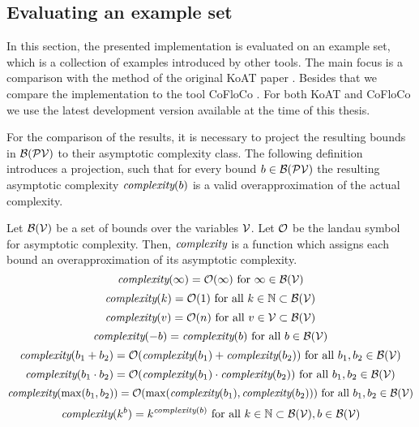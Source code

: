 \iffalse

\fi

\subsection{Evaluating an example set}

In this section, the presented implementation is evaluated on an example set, which is a collection of examples introduced by other tools.
The main focus is a comparison with the method of the original KoAT paper \cite{koat}.
Besides that we compare the implementation to the tool CoFloCo \cite{cofloco3}.
For both KoAT and CoFloCo we use the latest development version available at the time of this thesis.

For the comparison of the results, it is necessary to project the resulting bounds in $\mathcal{B}(\mathcal{PV})$ to their asymptotic complexity class.
The following definition introduces a projection, such that for every bound $b \in \mathcal{B}(\mathcal{PV})$ the resulting asymptotic complexity $\emph{complexity}(b)$ is a valid overapproximation of the actual complexity.

\begin{definition}
  Let $\mathcal{B}(\mathcal{V})$ be a set of bounds over the variables $\mathcal{V}$.
  Let $\mathcal{O}$ be the landau symbol for asymptotic complexity.
  Then, $\emph{complexity}$ is a function which assigns each bound an overapproximation of its asymptotic complexity.
  \[ \emph{complexity}(\infty) = \mathcal{O}(\infty) \text{ for } \infty \in \mathcal{B}(\mathcal{V}) \]
  \[ \emph{complexity}(k) = \mathcal{O}(1) \text{ for all } k \in \mathbb{N} \subset \mathcal{B}(\mathcal{V}) \] 
  \[ \emph{complexity}(v) = \mathcal{O}(n) \text{ for all } v \in \mathcal{V} \subset \mathcal{B}(\mathcal{V}) \] 
  \[ \emph{complexity}(-b) = \emph{complexity}(b) \text{ for all } b \in \mathcal{B}(\mathcal{V}) \] 
  \[ \emph{complexity}(b_1 + b_2) = \mathcal{O}(\emph{complexity}(b_1) + \emph{complexity}(b_2)) \text{ for all } b_1, b_2 \in \mathcal{B}(\mathcal{V}) \] 
  \[ \emph{complexity}(b_1 \cdot b_2) = \mathcal{O}(\emph{complexity}(b_1) \cdot \emph{complexity}(b_2)) \text{ for all } b_1, b_2 \in \mathcal{B}(\mathcal{V}) \] 
  \[ \emph{complexity}(\max(b_1, b_2)) = \mathcal{O}(\max(\emph{complexity}(b_1), \emph{complexity}(b_2))) \text{ for all } b_1, b_2 \in \mathcal{B}(\mathcal{V}) \]
  \[ \emph{complexity}(k^b) = k^{\emph{complexity}(b)} \text{ for all } k \in \mathbb{N} \subset \mathcal{B}(\mathcal{V}), b \in \mathcal{B}(\mathcal{V}) \]  
\end{definition}

